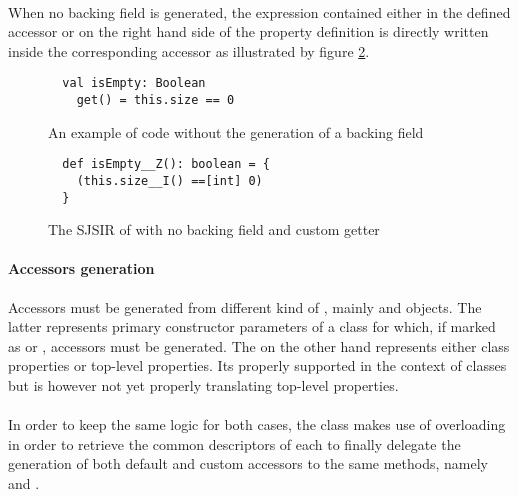 \paragraph{} When no backing field is generated, the expression contained either in the defined 
accessor or on the right hand side of the property definition is directly written inside the 
corresponding accessor as illustrated by figure \ref{no_backing_field_ir}.

\begin{figure}[h]
  \begin{verbatim}
  val isEmpty: Boolean
    get() = this.size == 0
  \end{verbatim}
  \caption{An example of code without the generation of a backing field}
  \label{no_backing_field}
\end{figure}


\begin{figure}[h!]
  \begin{verbatim}
  def isEmpty__Z(): boolean = {
    (this.size__I() ==[int] 0)
  }
  \end{verbatim}
  \caption{The SJSIR of  with no backing field and custom getter}
  \label{no_backing_field_ir}
\end{figure}

\paragraph{Accessors generation} Accessors must be generated from different kind of 
, mainly  and  objects. The latter 
represents primary constructor parameters of a class for which, if marked as  
or , accessors must be generated. The  on the other hand 
represents either class properties or top-level properties. Its properly supported in the context of classes but is however not yet properly translating top-level properties.

\paragraph{} In order to keep the same logic for both cases, the  class 
makes use of overloading in order to retrieve the common descriptors of each to finally delegate
the generation of both default and custom accessors to the same methods, namely  
and .

